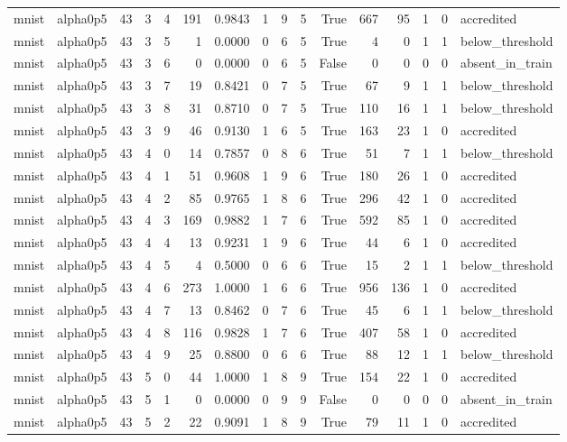 \begin{tabular}{llrrrrrrrrrrrrrl}
mnist & alpha0p5 & 43 & 3 & 4 & 191 & 0.9843 & 1 & 9 & 5 & True & 667 & 95 & 1 & 0 & accredited \\
mnist & alpha0p5 & 43 & 3 & 5 & 1 & 0.0000 & 0 & 6 & 5 & True & 4 & 0 & 1 & 1 & below\_threshold \\
mnist & alpha0p5 & 43 & 3 & 6 & 0 & 0.0000 & 0 & 6 & 5 & False & 0 & 0 & 0 & 0 & absent\_in\_train \\
mnist & alpha0p5 & 43 & 3 & 7 & 19 & 0.8421 & 0 & 7 & 5 & True & 67 & 9 & 1 & 1 & below\_threshold \\
mnist & alpha0p5 & 43 & 3 & 8 & 31 & 0.8710 & 0 & 7 & 5 & True & 110 & 16 & 1 & 1 & below\_threshold \\
mnist & alpha0p5 & 43 & 3 & 9 & 46 & 0.9130 & 1 & 6 & 5 & True & 163 & 23 & 1 & 0 & accredited \\
mnist & alpha0p5 & 43 & 4 & 0 & 14 & 0.7857 & 0 & 8 & 6 & True & 51 & 7 & 1 & 1 & below\_threshold \\
mnist & alpha0p5 & 43 & 4 & 1 & 51 & 0.9608 & 1 & 9 & 6 & True & 180 & 26 & 1 & 0 & accredited \\
mnist & alpha0p5 & 43 & 4 & 2 & 85 & 0.9765 & 1 & 8 & 6 & True & 296 & 42 & 1 & 0 & accredited \\
mnist & alpha0p5 & 43 & 4 & 3 & 169 & 0.9882 & 1 & 7 & 6 & True & 592 & 85 & 1 & 0 & accredited \\
mnist & alpha0p5 & 43 & 4 & 4 & 13 & 0.9231 & 1 & 9 & 6 & True & 44 & 6 & 1 & 0 & accredited \\
mnist & alpha0p5 & 43 & 4 & 5 & 4 & 0.5000 & 0 & 6 & 6 & True & 15 & 2 & 1 & 1 & below\_threshold \\
mnist & alpha0p5 & 43 & 4 & 6 & 273 & 1.0000 & 1 & 6 & 6 & True & 956 & 136 & 1 & 0 & accredited \\
mnist & alpha0p5 & 43 & 4 & 7 & 13 & 0.8462 & 0 & 7 & 6 & True & 45 & 6 & 1 & 1 & below\_threshold \\
mnist & alpha0p5 & 43 & 4 & 8 & 116 & 0.9828 & 1 & 7 & 6 & True & 407 & 58 & 1 & 0 & accredited \\
mnist & alpha0p5 & 43 & 4 & 9 & 25 & 0.8800 & 0 & 6 & 6 & True & 88 & 12 & 1 & 1 & below\_threshold \\
mnist & alpha0p5 & 43 & 5 & 0 & 44 & 1.0000 & 1 & 8 & 9 & True & 154 & 22 & 1 & 0 & accredited \\
mnist & alpha0p5 & 43 & 5 & 1 & 0 & 0.0000 & 0 & 9 & 9 & False & 0 & 0 & 0 & 0 & absent\_in\_train \\
mnist & alpha0p5 & 43 & 5 & 2 & 22 & 0.9091 & 1 & 8 & 9 & True & 79 & 11 & 1 & 0 & accredited \\

\end{tabular}

